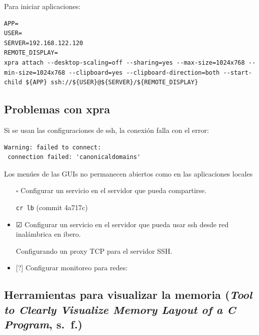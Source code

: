 \documentclass[
  12,
]{scrartcl}
\begin{document}
\begin{itemize}
  Para iniciar aplicaciones:

\begin{verbatim}
APP=
USER=
SERVER=192.168.122.120
REMOTE_DISPLAY=
xpra attach --desktop-scaling=off --sharing=yes --max-size=1024x768 --min-size=1024x768 --clipboard=yes --clipboard-direction=both --start-child ${APP} ssh://${USER}@${SERVER}/${REMOTE_DISPLAY}
\end{verbatim}

  \hypertarget{problemas-con-xpra}{%
  \subsection{Problemas con xpra}\label{problemas-con-xpra}}

  Si se usan las configuraciones de ssh, la conexión falla con el error:

\begin{verbatim}
Warning: failed to connect:
 connection failed: 'canonicaldomains'
\end{verbatim}

  Los menúes de las GUIs no permanecen abiertos como en las aplicaciones
  locales
\end{itemize}

\begin{itemize}
\item[$\square$]
  Configurar un servicio en el servidor que pueda compartirse.

  \texttt{cr\ lb} (commit 4a717c)
\item
  ☑ Configurar un servicio en el servidor que pueda usar ssh desde red
  inalámbrica en ibero.

  Configurando un proxy TCP para el servidor SSH.
\item
  {[}?{]} Configurar monitoreo para redes:
\end{itemize}

\hypertarget{herramientas-para-visualizar-la-memoria-urlhttpsstackoverflow.comquestions5752605tool-to-clearly-visualize-memory-layout-of-a-c-program}{%
\subsection{\texorpdfstring{Herramientas para visualizar la memoria
(\emph{Tool to Clearly Visualize Memory Layout of a C Program},
s.~f.)}{Herramientas para visualizar la memoria (Tool to Clearly Visualize Memory Layout of a C Program, s.~f.)}}\label{herramientas-para-visualizar-la-memoria-urlhttpsstackoverflow.comquestions5752605tool-to-clearly-visualize-memory-layout-of-a-c-program}}
\end{document}
